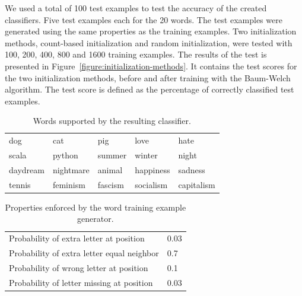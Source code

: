 We used a total of 100 test examples to test the accuracy of the created classifiers.
Five test examples each for the 20 words. 
The test examples were generated using the same properties as the training examples.
Two initialization methods, count-based initialization and random initialization, were tested with 100, 200, 400, 800 and 1600 training examples. 
The results of the test is presented in Figure~\ref{figure:initialization-methods}. 
It contains the test scores for the two initialization methods, before and after training with the Baum-Welch algorithm. 
The test score is defined as the percentage of correctly classified test examples.

\begin{table}[htb]
  \begin{center}
  \begin{tabular}{ l l l l l }
    dog      & cat       & pig     & love       & hate  \\
    scala    & python    & summer  & winter     & night  \\ 
    daydream & nightmare & animal  & happiness  & sadness \\ 
    tennis   & feminism  & fascism & socialism  & capitalism \\
  \end{tabular}
\end{center}
\caption{Words supported by the resulting classifier.} 
\label{tab:words_supported_by_classifier} 
\end{table}

\begin{table}[htb]
  \begin{center}
  \begin{tabular}{ l l }
    Probability of extra letter at position         & 0.03 \\
    Probability of extra letter equal neighbor      & 0.7 \\ 
    Probability of wrong letter at position         & 0.1 \\ 
    Probability of letter missing at position       & 0.03 \\
  \end{tabular}
\end{center}
\caption{Properties enforced by the word training example generator.} 
\label{tab:word_generator_properties} 
\end{table}

